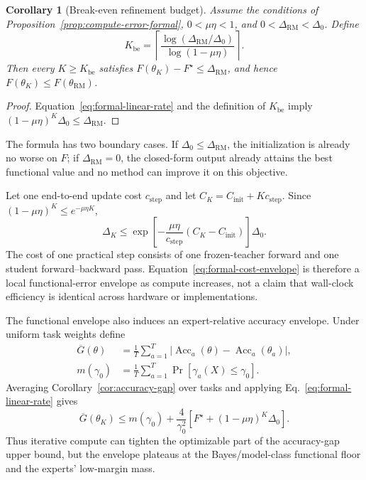 \documentclass[letterpaper]{article} %
\theoremstyle{plain}
\newtheorem{corollary}[theorem]{Corollary}
\theoremstyle{definition}
\begin{document}
\begin{corollary}[Break-even refinement budget]
\label{cor:break-even-formal}
Assume the conditions of Proposition~\ref{prop:compute-error-formal},
$0<\mu\eta<1$, and $0<\Delta_{\mathrm{RM}}<\Delta_0$. Define
\begin{equation}
K_{\mathrm{be}}
=
\left\lceil
\frac{\log(\Delta_{\mathrm{RM}}/\Delta_0)}
     {\log(1-\mu\eta)}
\right\rceil.
\label{eq:formal-break-even}
\end{equation}
Then every $K\ge K_{\mathrm{be}}$ satisfies
$F(\theta_K)-F^\star\le\Delta_{\mathrm{RM}}$, and hence
$F(\theta_K)\le F(\theta_{\mathrm{RM}})$.
\end{corollary}

\begin{proof}
Equation~\eqref{eq:formal-linear-rate} and the definition of
$K_{\mathrm{be}}$ imply
$(1-\mu\eta)^K\Delta_0\le\Delta_{\mathrm{RM}}$.
\end{proof}

The formula has two boundary cases. If
$\Delta_0\le\Delta_{\mathrm{RM}}$, the initialization is already no worse on $F$; if
$\Delta_{\mathrm{RM}}=0$, the closed-form output already attains the best functional
value and no method can improve it on this objective.

Let one end-to-end update cost $c_{\mathrm{step}}$ and let
$C_K=C_{\mathrm{init}}+Kc_{\mathrm{step}}$. Since
$(1-\mu\eta)^K\le e^{-\mu\eta K}$,
\begin{equation}
\Delta_K
\le
\exp\!\left[-\frac{\mu\eta}{c_{\mathrm{step}}}
(C_K-C_{\mathrm{init}})\right]\Delta_0.
\label{eq:formal-cost-envelope}
\end{equation}
The cost of one practical step consists of one frozen-teacher forward and one student
forward--backward pass. Equation~\eqref{eq:formal-cost-envelope} is therefore a local
functional-error envelope as compute increases, not a claim that wall-clock efficiency is
identical across hardware or implementations.

The functional envelope also induces an expert-relative accuracy envelope. Under uniform
task weights define
\begin{align}
\overline G(\theta)
&=\frac1T\sum_{a=1}^T
\left|\operatorname{Acc}_a(\theta)-\operatorname{Acc}_a(\theta_a)\right|,\\
m(\gamma_0)
&=\frac1T\sum_{a=1}^T\Pr[\gamma_a(X)\le\gamma_0].
\end{align}
Averaging Corollary~\ref{cor:accuracy-gap} over tasks and applying
Eq.~\eqref{eq:formal-linear-rate} gives
\begin{equation}
\overline G(\theta_K)
\le
m(\gamma_0)
+\frac{4}{\gamma_0^2}
\left[F^\star+(1-\mu\eta)^K\Delta_0\right].
\label{eq:accuracy-compute-envelope}
\end{equation}
Thus iterative compute can tighten the optimizable part of the accuracy-gap upper bound,
but the envelope plateaus at the Bayes/model-class functional floor and the experts'
low-margin mass.
\end{document}
